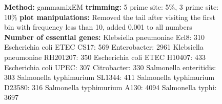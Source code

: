 \documentclass[a4paper,10pt]{article}
\begin{document}
\begin{figure}
{\textbf{Method:} gammamixEM \newline
\textbf{trimming:} 5 prime site: 5\%, 3 prime site: 10\%\newline
\textbf{plot manipulations:} Removed the tail after visiting the first bin with frequency less than 10, added 0.001 to all numbers \newline
\textbf{Number of essential genes:}\newline
Klebsiella pneumoniae Ecl8: 310 \newline
Escherichia coli ETEC CS17: 569 \newline
Enterobacter: 2961 \newline
Klebsiella pneumoniae RH201207: 350 \newline
Escherichia coli ETEC H10407: 433 \newline
Escherichia coli UPEC: 307 \newline
Citrobacter: 330 \newline
Salmonella enteritidis: 303 \newline
Salmonella typhimurium SL1344: 411 \newline
Salmonella typhimurium D23580: 316 \newline
Salmonella typhimurium A130: 4094 \newline
Salmonella typhi: 3697}
\end{figure}
\end{document}
